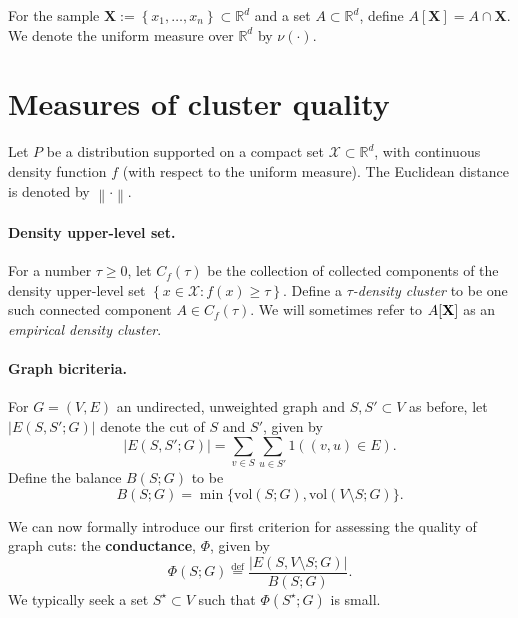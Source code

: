 \documentclass{article}
\newcommand{\set}[1]{\left\{#1\right\}}
\newcommand{\defeq}{\overset{\mathrm{def}}{=}}
\newcommand{\vol}{\text{vol}}
\newcommand{\abs}[1]{\left \lvert #1 \right \rvert}
\newcommand{\Reals}{\mathbb{R}}
\newcommand{\Rd}{\Reals^d}
\newcommand{\norm}[1]{\left\lVert#1\right\rVert}
\theoremstyle{aldenthm}
\theoremstyle{remark}
\begin{document}
\vspace{.05 in}

For the sample $\mathbf{X} := \set{x_1, \ldots, x_n} \subset \Rd$ and a set $A \subset \Rd$, define $A[\mathbf{X}] = A \cap \mathbf{X}$. We denote the uniform measure over $\Rd$ by $\nu(\cdot)$.

\section{Measures of cluster quality}
\label{sec: measures_of_cluster_quality}

Let $P$ be a distribution supported on a compact set $\mathcal{X} \subset \Rd$, with continuous density function $f$ (with respect to the uniform measure). The Euclidean distance is denoted by $\norm{ \cdot }$. 

\paragraph{Density upper-level set.}
For a number $\tau \geq 0$, let $C_f(\tau)$ be the collection of collected components of the density upper-level set $\set{x \in \mathcal{X}: f(x) \geq \tau}$. Define a \textit{$\tau$-density cluster} to be one such connected component $A \in C_f(\tau)$.  We will sometimes refer to $A[\bf{X}]$ as an \textit{empirical density cluster}.

\paragraph{Graph bicriteria.}
For $G = (V,E)$ an undirected, unweighted graph and $S, S' \subset V$ as before, let $\abs{E(S, S'; G)}$ denote the cut of $S$ and $S'$, given by
\begin{equation*}
\abs{E(S, S'; G)} = \sum_{v \in S} \sum_{u \in S'} 1((v,u) \in E).
\end{equation*}
Define the balance $B(S; G)$ to be
\begin{equation*}
B(S; G) = \min\{\vol(S;G), \vol(V \setminus S;G)\}.
\end{equation*}

We can now formally introduce our first criterion for assessing the quality of graph cuts: the \textbf{conductance}, $\Phi$, given by
\begin{equation}
\label{eqn: conductance}
\Phi(S; G) \defeq \frac{\abs{E(S, V \setminus S; G)}}{B(S; G)}.
\end{equation}
We typically seek a set $S^{\star} \subset V$ such that $\Phi(S^{\star}; G)$ is small. 
\end{document}
